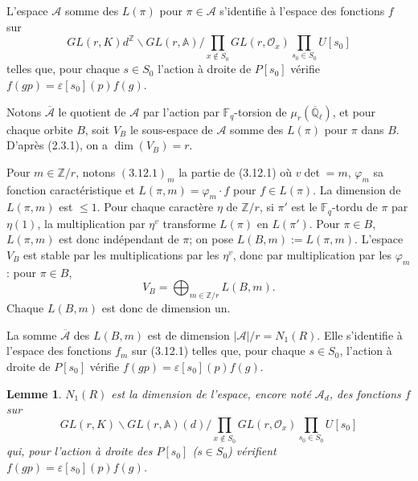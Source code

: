 \documentclass[11pt,a4paper]{article}
\theoremstyle{plain}
\newtheorem{lemme}[theorem]{Lemme}
\theoremstyle{definition}
\newcommand{\Z}{\mathbb{Z}}
\newcommand{\F}{\mathbb{F}}
\newcommand{\Ql}{\overline{\mathbb{Q}}_\ell}
\begin{document}
\subsection{}
L'espace $\mathcal{A}$ somme des $L(\pi)$ pour $\pi \in \mathcal{A}$ s'identifie \`a l'espace des fonctions $f$ sur
\begin{equation}
GL(r, K) d^\Z \backslash GL(r, \mathbb{A}) / \prod_{x \notin S_0} GL(r, \mathcal{O}_x) \prod_{s_0 \in S_0} U[s_0]
\tag{3.12.1}
\end{equation}
telles que, pour chaque $s \in S_0$ l'action \`a droite de $P[s_0]$ v\'erifie $f(gp) = \varepsilon[s_0](p) f(g)$.

Notons $\overline{\mathcal{A}}$ le quotient de $\mathcal{A}$ par l'action par $\F_q$-torsion de $\mu_r(\Ql)$, et pour chaque orbite $B$, soit $V_B$ le sous-espace de $\mathcal{A}$ somme des $L(\pi)$ pour $\pi$ dans $B$. D'apr\`es (2.3.1), on a $\dim(V_B) = r$.

Pour $m \in \Z/r$, notons $(3.12.1)_m$ la partie de (3.12.1) o\`u $v \det = m$, $\varphi_m$ sa fonction caract\'eristique et $L(\pi, m) = \varphi_m \cdot f$ pour $f \in L(\pi)$. La dimension de $L(\pi, m)$ est $\leq 1$. Pour chaque caract\`ere $\eta$ de $\Z/r$, si $\pi'$ est le $\F_q$-tordu de $\pi$ par $\eta(1)$, la multiplication par $\eta^v$ transforme $L(\pi)$ en $L(\pi')$. Pour $\pi \in B$, $L(\pi, m)$ est donc ind\'ependant de $\pi$; on pose $L(B, m) := L(\pi, m)$. L'espace $V_B$ est stable par les multiplications par les $\eta^v$, donc par multiplication par les $\varphi_m$: pour $\pi \in B$,
\[
V_B = \bigoplus_{m \in \Z/r} L(B, m).
\]
Chaque $L(B, m)$ est donc de dimension un.

La somme $\overline{\mathcal{A}}$ des $L(B, m)$ est de dimension $|\mathcal{A}|/r = N_1(R)$. Elle s'identifie \`a l'espace des fonctions $f_m$ sur (3.12.1) telles que, pour chaque $s \in S_0$, l'action \`a droite de $P[s_0]$ v\'erifie $f(gp) = \varepsilon[s_0](p) f(g)$.

\begin{lemme}
$N_1(R)$ est la dimension de l'espace, encore not\'e $\mathcal{A}_d$, des fonctions $f$ sur
\begin{equation}
GL(r, K) \backslash GL(r, \mathbb{A})(d) / \prod_{x \notin S_0} GL(r, \mathcal{O}_x) \prod_{s_0 \in S_0} U[s_0]
\tag{3.12.2}
\end{equation}
qui, pour l'action \`a droite des $P[s_0]$ ($s \in S_0$) v\'erifient $f(gp) = \varepsilon[s_0](p) f(g)$.
\end{lemme}
\end{document}
